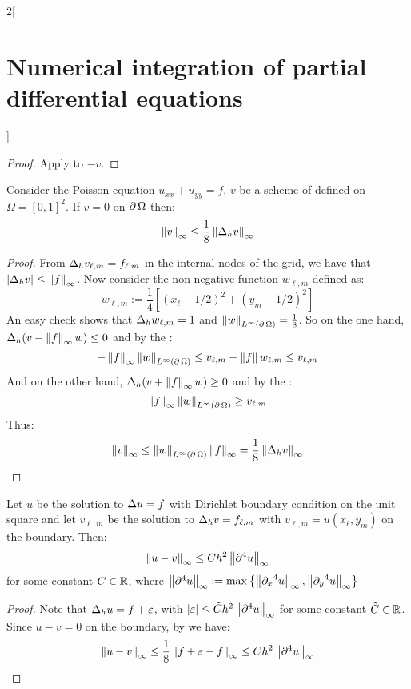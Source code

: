 \documentclass[../../../main_math.tex]{subfiles}
\begin{document}
\begin{multicols}{2}[\section{Numerical integration of partial differential equations}]
\begin{corollary}
  \end{corollary}
  \begin{proof}
    Apply  to $-v$.
  \end{proof}
  \begin{theorem}\label{NIPDE:pois_bound_V}
    Consider the Poisson equation $u_{xx}+u_{yy}=f$, $v$ be a scheme of  defined on $\Omega={[0,1]}^2$. If $v=0$ on $\operatorname{\partial}{\Omega}$ then:
    $$
      \left\|v\right\|_\infty\leq \frac{1}{8}\left\|\Delta_h v\right\|_\infty
    $$
  \end{theorem}
  \begin{proof}
    From $\Delta_h v_{\ell,m}=f_{\ell,m}$ in the internal nodes of the grid, we have that $\abs{\Delta_h v}\leq \left\|f\right\|_\infty$. Now consider the non-negative function $w_{\ell,m}$ defined as:
    $$
      w_{\ell,m}:= \frac{1}{4}\left[{\left(x_\ell-1/2\right)}^2+{\left(y_m-1/2\right)}^2\right]
    $$
    An easy check shows that $\Delta_h w_{\ell,m}=1$ and $\left\|w\right\|_{L^\infty(\operatorname{\partial}{\Omega})}=\frac{1}{8}$. So on the one hand, $\Delta_h(v-\left\|f\right\|_\infty w)\leq 0$ and by the :
    $$
      -\left\|f\right\|_\infty\left\|w\right\|_{L^\infty(\operatorname{\partial}{\Omega})}\leq v_{\ell,m}-\left\|f\right\| w_{\ell,m}\leq v_{\ell,m}
    $$
    And on the other hand, $\Delta_h(v+\left\|f\right\|_\infty w)\geq 0$ and by the :
    $$
      \left\|f\right\|_\infty\left\|w\right\|_{L^\infty(\operatorname{\partial}{\Omega})}\geq v_{\ell,m}
    $$
    Thus:
    $$
      \left\|v\right\|_\infty\leq \left\|w\right\|_{L^\infty(\operatorname{\partial}{\Omega})}\left\|f\right\|_\infty= \frac{1}{8}\left\|\Delta_h v\right\|_\infty
    $$
  \end{proof}
  \begin{theorem}
    Let $u$ be the solution to $\Delta u=f$ with Dirichlet boundary condition on the unit square and let $v_{\ell,m}$ be the solution to $\Delta_h v=f_{\ell,m}$ with $v_{\ell,m}=u(x_\ell,y_m)$ on the boundary. Then:
    $$
      \left\|u-v\right\|_\infty\leq C h^2\left\|\partial^4u\right\|_\infty
    $$
    for some constant $C\in\mathbb{R}$, where $\left\|\partial^4u\right\|_\infty:=\max\left\{\left\|{\partial_x}^4u\right\|_\infty,\left\|{\partial_y}^4u\right\|_\infty\right\}$
  \end{theorem}
  \begin{proof}
    Note that $\Delta_h u=f+\varepsilon$, with $\abs{\varepsilon}\leq \tilde{C} h^2\left\|\partial^4u\right\|_\infty$ for some constant $\tilde{C}\in\mathbb{R}$. Since $u-v=0$ on the boundary, by  we have:
    $$
      \left\|u-v\right\|_\infty\leq\frac{1}{8}\left\|f+\varepsilon -f\right\|_\infty\leq C h^2\left\|\partial^4u\right\|_\infty
    $$
  \end{proof}

\end{multicols}
\end{document}
